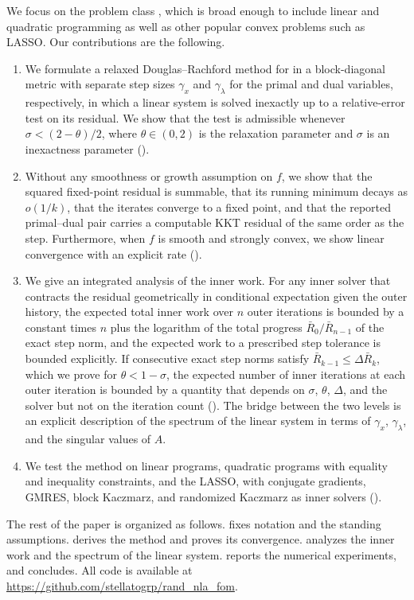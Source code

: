 \documentclass[11pt]{article}
\begin{document}
We focus on the problem class , which is broad enough to include linear and quadratic programming as well as other popular convex problems such as LASSO. %
Our contributions are the following.
\begin{enumerate}
    \item We formulate a relaxed Douglas--Rachford method for  in a block-diagonal metric with separate step sizes $\gamma_x$ and $\gamma_\lambda$ for the primal and dual variables, respectively, in which a linear system is solved inexactly up to a relative-error test on its residual.
    We show that the test is admissible whenever $\sigma < (2 - \theta)/2$, where $\theta \in (0, 2)$ is the relaxation parameter and $\sigma$ is an inexactness parameter ().
    \item Without any smoothness or growth assumption on $f$, we show that the squared fixed-point residual is summable, that its running minimum decays as $o(1/k)$, that the iterates converge to a fixed point, and that the reported primal--dual pair carries a computable KKT residual of the same order as the step.
    Furthermore, when $f$ is smooth and strongly convex, we show linear convergence with an explicit rate ().
    \item We give an integrated analysis of the inner work.
    For any inner solver that contracts the residual geometrically in conditional expectation given the outer history, the expected total inner work over $n$ outer iterations is bounded by a constant times $n$ plus the logarithm of the total progress $\bar R_0/\bar R_{n-1}$ of the exact step norm, and the expected work to a prescribed step tolerance is bounded explicitly.
    If consecutive exact step norms satisfy $\bar R_{k-1} \leq \Delta \bar R_k$, which we prove for $\theta < 1 - \sigma$, the expected number of inner iterations at each outer iteration is bounded by a quantity that depends on $\sigma$, $\theta$, $\Delta$, and the solver but not on the iteration count ().
    The bridge between the two levels is an explicit description of the spectrum of the linear system in terms of $\gamma_x$, $\gamma_\lambda$, and the singular values of $A$.
    \item We test the method on linear programs, quadratic programs with equality and inequality constraints, and the LASSO, with conjugate gradients, GMRES, block Kaczmarz, and randomized Kaczmarz as inner solvers ().
\end{enumerate}
The rest of the paper is organized as follows.
 fixes notation and the standing assumptions.
 derives the method and proves its convergence.
 analyzes the inner work and the spectrum of the linear system.
 reports the numerical experiments, and  concludes.
All code is available at \url{https://github.com/stellatogrp/rand_nla_fom}.
\end{document}
